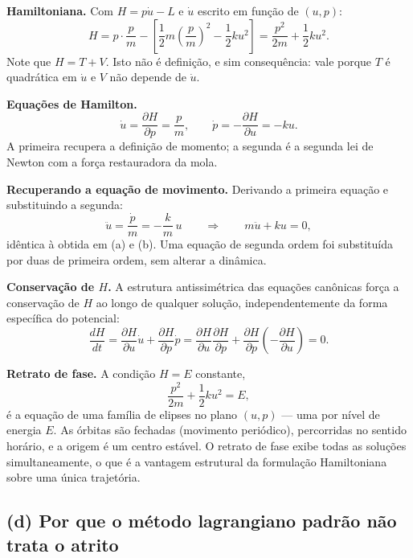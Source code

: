 \documentclass{article}
\begin{document}
\textbf{Hamiltoniana.} Com $H = p\dot u - L$ e $\dot u$ escrito em função de $(u,p)$:
\[
H = p\cdot\frac{p}{m} - \left[\frac{1}{2}m\left(\frac{p}{m}\right)^2 - \frac{1}{2}ku^2\right]
= \frac{p^2}{2m} + \frac{1}{2}ku^2.
\]
Note que $H = T + V$. Isto não é definição, e sim consequência: vale porque $T$ é
quadrática em $\dot u$ e $V$ não depende de $\dot u$.

\textbf{Equações de Hamilton.}
\[
\dot u = \frac{\partial H}{\partial p} = \frac{p}{m},
\qquad
\dot p = -\frac{\partial H}{\partial u} = -ku.
\]
A primeira recupera a definição de momento; a segunda é a segunda lei de Newton
com a força restauradora da mola.

\textbf{Recuperando a equação de movimento.} Derivando a primeira equação e
substituindo a segunda:
\[
\ddot u = \frac{\dot p}{m} = -\frac{k}{m}\,u
\qquad\Longrightarrow\qquad
m\ddot u + ku = 0,
\]
idêntica à obtida em (a) e (b). Uma equação de segunda ordem foi substituída por
duas de primeira ordem, sem alterar a dinâmica.

\textbf{Conservação de $H$.} A estrutura antissimétrica das equações canônicas
força a conservação de $H$ ao longo de qualquer solução, independentemente da
forma específica do potencial:
\[
\frac{dH}{dt}
= \frac{\partial H}{\partial u}\dot u + \frac{\partial H}{\partial p}\dot p
= \frac{\partial H}{\partial u}\frac{\partial H}{\partial p}
+ \frac{\partial H}{\partial p}\left(-\frac{\partial H}{\partial u}\right) = 0.
\]

\textbf{Retrato de fase.} A condição $H = E$ constante,
\[
\frac{p^2}{2m} + \frac{1}{2}ku^2 = E,
\]
é a equação de uma família de elipses no plano $(u,p)$ — uma por nível de energia
$E$. As órbitas são fechadas (movimento periódico), percorridas no sentido
horário, e a origem é um centro estável. O retrato de fase exibe todas as
soluções simultaneamente, o que é a vantagem estrutural da formulação
Hamiltoniana sobre uma única trajetória.

\subsection*{(d) Por que o método lagrangiano padrão não trata o atrito}
\end{document}
